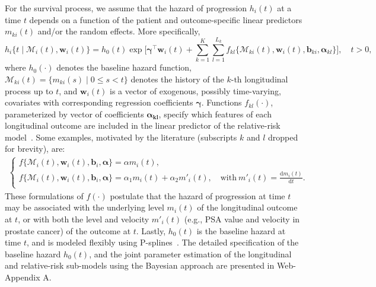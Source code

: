 For the survival process, we assume that the hazard of progression $h_i(t)$ at a time $t$ depends on a function of the patient and outcome-specific linear predictors $m_{ki}(t)$ and/or the random effects. More specifically,
\begin{equation}
\label{eq:rel_risk_model}
h_i\big\{t \mid \mathcal{M}_i(t), \boldsymbol{w}_i(t)\big\} = h_0(t) \exp\Big[\boldsymbol{\gamma}^{\top}\boldsymbol{w}_i(t) + \sum_{k=1}^{K} \sum_{l=1}^{L_k} f_{kl} \big\{ \mathcal{M}_{ki}(t), \boldsymbol{w}_i(t), \boldsymbol{b}_{ki}, \boldsymbol{\alpha}_{kl} \big\}\Big], \quad t>0,
\end{equation}
where $h_0(\cdot)$ denotes the baseline hazard function, $\mathcal{M}_{ki}(t)=\{m_{ki}(s) \mid 0 \leq s < t \}$ denotes the history of the ${k\mbox{-th}}$ longitudinal process up to $t$, and $\boldsymbol{w}_i(t)$ is a vector of exogenous, possibly time-varying, covariates with corresponding regression coefficients $\boldsymbol{\gamma}$. Functions $f_{kl}(\cdot)$, parameterized by vector of coefficients $\boldsymbol{\alpha_{kl}}$, specify which features of each longitudinal outcome are included in the linear predictor of the relative-risk model~\citep{brown2009assessing,rizopoulos2012joint,taylor2013real}. Some examples, motivated by the literature (subscripts $k$ and $l$ dropped for brevity), are:
\begin{eqnarray*}
\left \{
\begin{array}{l}
f\big\{\mathcal{M}_{i}(t), \boldsymbol{w}_i(t), \boldsymbol{b}_{i}, \boldsymbol{\alpha} \big\} = \alpha m_{i}(t),\\
f\big\{ \mathcal{M}_{i}(t), \boldsymbol{w}_i(t), \boldsymbol{b}_{i}, \boldsymbol{\alpha}\big\} = \alpha_1 m_{i}(t) + \alpha_2 m'_{i}(t),\quad \text{with}\  m'_{i}(t) = \frac{\mathrm{d}{m_{i}(t)}}{\mathrm{d}{t}}.\\
\end{array}
\right.
\end{eqnarray*}
These formulations of $f(\cdot)$ postulate that the hazard of progression at time $t$ may be associated with the underlying level $m_i(t)$ of the longitudinal outcome at $t$, or with both the level and velocity $m'_i(t)$ (e.g., PSA value and velocity in prostate cancer) of the outcome at $t$. Lastly, $h_0(t)$ is the baseline hazard at time $t$, and is modeled flexibly using P-splines~\citep{eilers1996flexible}. The detailed specification of the baseline hazard $h_0(t)$, and the joint parameter estimation of the longitudinal and relative-risk sub-models using the Bayesian approach are presented in Web-Appendix A.
